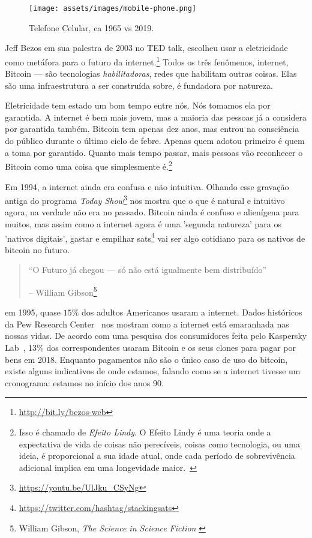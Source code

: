 \begin{figure}
  \texttt{[image: assets/images/mobile-phone.png]}
  \caption{Telefone Celular, ca 1965 vs 2019.}
  \label{fig:mobile-phone}
\end{figure}

Jeff Bezos em sua palestra de 2003 no TED talk, escolheu usar a eletricidade 
como metáfora para o futuro da internet.\footnote{\url{http://bit.ly/bezos-web}} 
Todos os três fenômenos, internet, Bitcoin --- são tecnologias \textit{habilitadoras}, 
redes que habilitam outras coisas. Elas são uma infraestrutura a ser construída sobre, 
é fundadora por natureza.

Eletricidade tem estado um bom tempo entre nós. Nós tomamos ela por garantida.
A internet é bem mais jovem, mas a maioria das pessoas já a considera por 
garantida também. Bitcoin tem apenas dez anos, mas entrou na consciência 
do público durante o último ciclo de febre. Apenas quem adotou primeiro é 
quem a toma por garantido. Quanto mais tempo passar, mais pessoas vão reconhecer 
o Bitcoin como uma coisa que simplesmente é.\footnote{Isso é chamado de
	\textit{Efeito Lindy}. O Efeito Lindy é uma teoria onde a expectativa 
	de vida de coisas não perecíveis, coisas como tecnologia, ou uma ideia, 
	é proporcional a sua idade atual, onde cada período de sobrevivência adicional 
	implica em uma longevidade maior.~\cite{wiki:lindy}}

Em 1994, a internet ainda era confusa e não intuitiva. Olhando esse gravação antiga
do programa  \textit{Today Show}\footnote{\url{https://youtu.be/UlJku_CSyNg}} nos mostra que o que é 
natural e intuitivo agora, na verdade não era no passado. Bitcoin ainda é confuso e alienígena 
para muitos, mas assim como a internet agora é uma 'segunda natureza' para os 'nativos digitais', 
gastar e empilhar sats\footnote{\url{https://twitter.com/hashtag/stackingsats}} vai ser algo 
cotidiano para os nativos de bitcoin no futuro.

\begin{quotation}\begin{samepage}
\enquote{O Futuro já chegou --- só não está igualmente bem distribuído}
\begin{flushright} -- William Gibson\footnote{William Gibson, \textit{The Science in Science Fiction} \cite{william-gibson}}
\end{flushright}\end{samepage}\end{quotation}

em 1995, quase $15\%$ dos adultos Americanos usaram a internet. 
Dados históricos da Pew Research Center~\cite{pew-research} nos mostram como a internet está 
emaranhada nas nossas vidas. De acordo com uma pesquisa dos consumidores feita pelo 
Kaspersky Lab~\cite{web:kaspersky}, 13\% dos correspondentes usaram Bitcoin e os seus clones para pagar por 
bens em 2018. Enquanto pagamentos não são o único caso de uso do bitcoin, existe alguns indicativos de onde 
estamos, falando como se a internet tivesse um cronograma: estamos no início dos anos 90.


